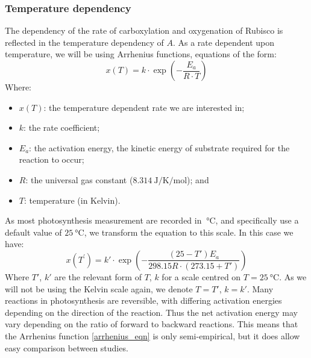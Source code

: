 \documentclass[11pt]{article} %
\begin{document}
\subsubsection{Temperature dependency}
The dependency of the rate of carboxylation and oxygenation of Rubisco is reflected in the temperature dependency of $A$. As a rate dependent upon temperature, we will be using Arrhenius functions, equations of the form:
\begin{equation} \label{arrhenius_eqn_kelvin}
x(T) = k \cdot \exp \left(-\frac{E_a}{R \cdot T}\right)
\end{equation}
Where:
\begin{itemize}
 \item $x(T)$: the temperature dependent rate we are interested in;
 \item $k$: the rate coefficient;
 \item $E_a$: the activation energy, the kinetic energy of substrate required for the reaction to occur;
 \item $R$: the universal gas constant ($\SI{8.314}{\J \per \K \per \mol}$); and
 \item $T$: temperature (in Kelvin).
\end{itemize}
As most photosynthesis measurement are recorded in $\SI{}{\celsius}$, and specifically use a default value of $\SI{25}{\celsius}$, we transform the equation to this scale. In this case we have:
\begin{equation} \label{arrhenius_eqn}
x(T^\prime) = k' \cdot \exp \left(-\frac{(25 - T')E_a}{298.15 R \cdot (273.15 + T')}\right)
\end{equation}
Where $T'$, $k'$ are the relevant form of $T$, $k$ for a scale centred on $T = \SI{25}{\celsius}$. As we will not be using the Kelvin scale again, we denote $T = T'$, $k = k'$.
Many reactions in photosynthesis are reversible, with differing activation energies depending on the direction of the reaction. Thus the net activation energy may vary depending on the ratio of forward to backward reactions. This means that the Arrhenius function \eqref{arrhenius_eqn} is only semi-empirical, but it does allow easy comparison between studies.
\end{document}
